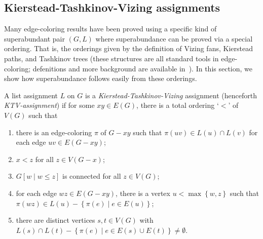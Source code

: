 \documentclass[12pt]{article}
\theoremstyle{plain}
\theoremstyle{definition}
\theoremstyle{remark}
\newcommand{\set}[1]{\left\{ #1 \right\}}
\newcommand{\setbs}[2]{\left\{ #1 \mid #2 \right\}}
\newcommand{\brackets}[1]{\left[ #1 \right]}
\begin{document}
\subsection{Kierstead-Tashkinov-Vizing assignments}
Many edge-coloring results have been proved using a specific kind of
superabundant pair $(G, L)$ where superabundance can be proved via a special
ordering. That is, the orderings given by the definition of Vizing fans,
Kierstead paths, and Tashkinov trees (these structures are all standard tools in
edge-coloring; defenitions and more background are available
in~\cite{stiebitz2012graph}).
In this section, we show how superabundance follows easily from these orderings.

A list assignment $L$ on $G$ is a \emph{Kierstead-Tashkinov-Vizing} assignment (henceforth \emph{KTV-assignment}) if for some $xy \in E(G)$, there is a total ordering `$<$' of $V(G)$ such that

\begin{enumerate}
\item there is an edge-coloring $\pi$ of $G-xy$ such that $\pi(uv) \in L(u)
\cap L(v)$ for each edge $uv \in E(G - xy)$; 
\item $x < z$ for all $z \in V(G - x)$; 
\item $G\brackets{w \mid w \le z}$ is connected for all $z \in V(G)$; 
\item for each edge $wz \in E(G - xy)$, there is a vertex $u < \max\set{w, z}$ such that
$\pi(wz) \in L(u) - \setbs{\pi(e)}{e \in E(u)}$;
\item there are distinct vertices $s, t \in V(G)$ with $L(s) \cap L(t) -
\setbs{\pi(e)}{e \in E(s) \cup E(t)} \ne \emptyset$.
\end{enumerate}
\end{document}
